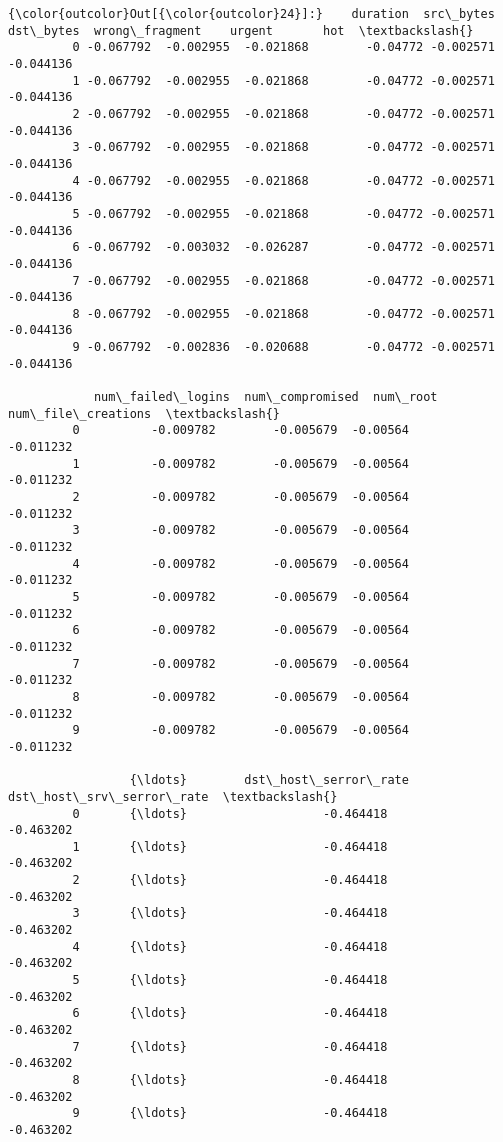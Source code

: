 \documentclass[11pt]{article}
\begin{document}
\begin{Verbatim}[commandchars=\\\{\}]
{\color{outcolor}Out[{\color{outcolor}24}]:}    duration  src\_bytes  dst\_bytes  wrong\_fragment    urgent       hot  \textbackslash{}
         0 -0.067792  -0.002955  -0.021868        -0.04772 -0.002571 -0.044136   
         1 -0.067792  -0.002955  -0.021868        -0.04772 -0.002571 -0.044136   
         2 -0.067792  -0.002955  -0.021868        -0.04772 -0.002571 -0.044136   
         3 -0.067792  -0.002955  -0.021868        -0.04772 -0.002571 -0.044136   
         4 -0.067792  -0.002955  -0.021868        -0.04772 -0.002571 -0.044136   
         5 -0.067792  -0.002955  -0.021868        -0.04772 -0.002571 -0.044136   
         6 -0.067792  -0.003032  -0.026287        -0.04772 -0.002571 -0.044136   
         7 -0.067792  -0.002955  -0.021868        -0.04772 -0.002571 -0.044136   
         8 -0.067792  -0.002955  -0.021868        -0.04772 -0.002571 -0.044136   
         9 -0.067792  -0.002836  -0.020688        -0.04772 -0.002571 -0.044136   
         
            num\_failed\_logins  num\_compromised  num\_root  num\_file\_creations  \textbackslash{}
         0          -0.009782        -0.005679  -0.00564           -0.011232   
         1          -0.009782        -0.005679  -0.00564           -0.011232   
         2          -0.009782        -0.005679  -0.00564           -0.011232   
         3          -0.009782        -0.005679  -0.00564           -0.011232   
         4          -0.009782        -0.005679  -0.00564           -0.011232   
         5          -0.009782        -0.005679  -0.00564           -0.011232   
         6          -0.009782        -0.005679  -0.00564           -0.011232   
         7          -0.009782        -0.005679  -0.00564           -0.011232   
         8          -0.009782        -0.005679  -0.00564           -0.011232   
         9          -0.009782        -0.005679  -0.00564           -0.011232   
         
                 {\ldots}        dst\_host\_serror\_rate  dst\_host\_srv\_serror\_rate  \textbackslash{}
         0       {\ldots}                   -0.464418                 -0.463202   
         1       {\ldots}                   -0.464418                 -0.463202   
         2       {\ldots}                   -0.464418                 -0.463202   
         3       {\ldots}                   -0.464418                 -0.463202   
         4       {\ldots}                   -0.464418                 -0.463202   
         5       {\ldots}                   -0.464418                 -0.463202   
         6       {\ldots}                   -0.464418                 -0.463202   
         7       {\ldots}                   -0.464418                 -0.463202   
         8       {\ldots}                   -0.464418                 -0.463202   
         9       {\ldots}                   -0.464418                 -0.463202   
         

\end{Verbatim}
\end{document}
